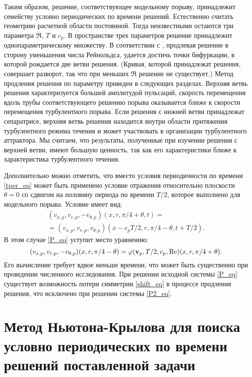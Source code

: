 Таким образом, решение, соответствующее модельному порыву, принадлежит семейству условно периодических по времени решений. Естественно считать геометрию расчетной области постоянной. Тогда неизвестными остаются три параметра $\Re$, $T$ и $c_p$. В пространстве трех параметров решение принадлежит однопараметрическому множеству. В соответствии с \cite{Avila2013}, продлевая решение в сторону уменьшения числа Рейнольдса, удается достичь точки бифуркации, в которой рождается две ветви решения. (Кривая, которой принадлежат решения, совершает разворот, так что при меньших $\Re$ решение не существует.) Метод продления решения по параметру приведен в следующих разделах. Верхняя ветвь решения характеризуется большей амплитудой пульсаций, скорость перемещения вдоль трубы соответствующего решению порыва оказывается ближе к скорости перемещения турбулентного порыва. Если решения с нижней ветви принадлежат сепаратрисе, верхняя ветвь решения находится внутри области притяжения турбулентного режима течения и может участвовать в организации турбулентного аттрактора. Мы считаем, что результаты, полученные при изучении решения с верхней ветви, имеют большую ценность, так как его характеристики ближе к характеристика турбулентного течения. 

Дополнительно можно отметить, что вместо условия периодичности по времени \eqref{tper_eq} может быть применено условие отражения относительно плоскости $\theta = 0$ со сдвигом на половину периода по времени $T/2$, которое выполнено для модельного порыва. Условие имеет вид:
\begin{multline}\label{shift_eq}
(v_{x,p}, v_{r,p}, - v_{\theta,p})(x,r,\pi/4 + \theta,t) = \\ =(v_{x,p}, v_{r,p}, v_{\theta,p})(x - c_p T/2,r,\pi/4 - \theta,t+T/2).
\end{multline}
В этом случае \eqref{P_eq} уступит место уравнению:
\begin{equation}\label{P2_eq}
(v_{x,p}, v_{r,p}, - v_{\theta,p})(x,r,\pi/4 - \theta) = \varphi(\mathbf{v}_p, T/2, c_p, \operatorname{Re})(x,r,\pi/4 + \theta).
\end{equation}
Его вычисление требует вдвое меньше времени, что может быть существенно при проведении численного исследования. При решении исходной системы \eqref{P_eq} существует возможность потери симметрии \eqref{shift_eq} в процессе продления решения, что исключено при решении системы \eqref{P2_eq}.


\section{Метод Ньютона-Крылова для поиска условно периодических по времени решений поставленной задачи} \label{Newton_seq}

